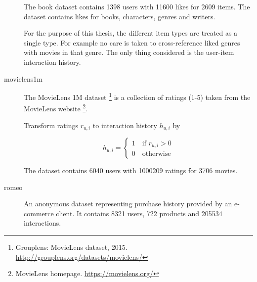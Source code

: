 \begin{description}
        The book dataset contains 1398 users with 11600 likes for 2609 items. The dataset contains likes for books, characters, genres and writers.

        For the purpose of this thesis, the different item types are treated as a single type. For example no care is taken to cross-reference liked genres with movies in that genre. The only thing considered is the user-item interaction history.





    \item[movielens1m] \hfill

        The MovieLens 1M dataset \footnote{Grouplens: MovieLens dataset, 2015. \url{http://grouplens.org/datasets/movielens/}} is a collection of ratings (1-5) taken from the MovieLens website \footnote{MovieLens homepage. \url{https://movielens.org/}}.

        Transform ratings $r_{u, i}$ to interaction history $h_{u, i}$ by

        \begin{equation}
            h_{u, i} = \begin{cases}
                1 \quad \text{if } r_{u, i} > 0 \\
                0 \quad \text{otherwise}
            \end{cases}
        \end{equation}

        The dataset contains 6040 users with 1000209 ratings for 3706 movies.



    \item[romeo] \hfill

        An anonymous dataset representing purchase history provided by an e-commerce client. It contains 8321 users, 722 products and 205534 interactions.




\end{description}


